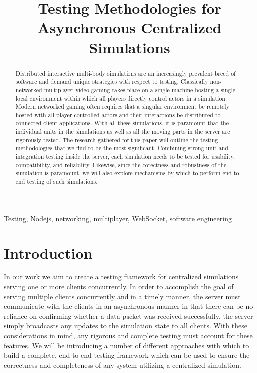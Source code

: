\documentclass[conference]{IEEEtran}
\begin{document}
\title{Testing Methodologies for Asynchronous Centralized Simulations\\
}

\author{
}

\maketitle

\begin{abstract}
 Distributed interactive multi-body simulations are an increasingly prevalent breed of software and demand unique strategies with respect to testing. 
 Classically non-networked multiplayer video gaming takes place on a single machine hosting a single local environment within which all players directly 
 control actors in a simulation. Modern networked gaming often requires that a singular environment be remotely hosted with all player-controlled actors and 
 their interactions be distributed to connected client applications. With all these simulations, it is paramount that the individual units in the simulations 
 as well as all the moving parts in the server are rigorously tested. The research gathered for this paper will outline the testing methodologies that we find 
 to be the most significant. Combining strong unit and integration testing inside the server, each simulation needs to be tested for usability, compatibility, and 
 reliability. Likewise, since the corectness and robustness of the simulation is paramount, we will also explore mechanisms by which to perform end to end testing of such simulations.

\end{abstract}

\begin{IEEEkeywords}
Testing, Nodejs, networking, multiplayer, WebSocket, software engineering
\end{IEEEkeywords}

\section{Introduction}
In our work we aim to create a testing framework for centralized simulations serving one or more clients concurrently. In order to accomplish the goal of serving
multiple clients concurrently and in a timely manner, the server must communicate with the clients in an asynchronous manner in that there can be no reliance 
on confirming whether a data packet was received successfully, the server simply broadcasts any updates to the simulation state to all clients. With these considerations
in mind, any rigorous and complete testing must account for these features. We will be introducing a number of different approaches with which to build a complete, end to end
testing framework which can be used to ensure the correctness and completeness of any system utilizing a centralized simulation.
\end{document}
